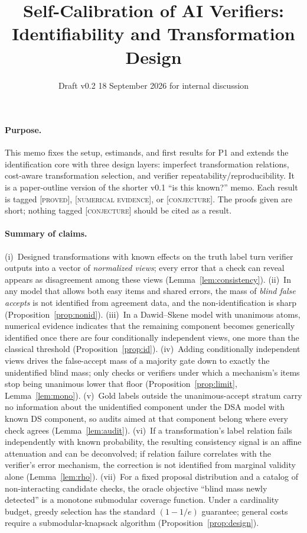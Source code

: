 \documentclass[11pt]{article}
\title{\textbf{Self-Calibration of AI Verifiers:}\\[2pt]
\large Identifiability and Transformation Design}
\author{Draft v0.2 \textperiodcentered{} 18 September 2026 \textperiodcentered{} for internal discussion}
\date{}
\theoremstyle{definition}
\theoremstyle{remark}
\begin{document}
\maketitle
\vspace{-2.5em}

\paragraph{Purpose.} This memo fixes the setup, estimands, and first results for P1 and extends the identification core with three design layers: imperfect transformation relations, cost-aware transformation selection, and verifier repeatability/reproducibility. It is a paper-outline version of the shorter v0.1 ``is this known?'' memo. Each result is tagged \textsc{[proved]}, \textsc{[numerical evidence]}, or \textsc{[conjecture]}. The proofs given are short; nothing tagged \textsc{[conjecture]} should be cited as a result.

\paragraph{Summary of claims.}
(i)~Designed transformations with known effects on the truth label turn verifier outputs into a vector of \emph{normalized views}; every error that a check can reveal appears as disagreement among these views (Lemma~\ref{lem:consistency}).
(ii)~In any model that allows both easy items and shared errors, the mass of \emph{blind false accepts} is not identified from agreement data, and the non-identification is sharp (Proposition~\ref{prop:nonid}).
(iii)~In a Dawid--Skene model with unanimous atoms, numerical evidence indicates that the remaining component becomes generically identified once there are four conditionally independent views, one more than the classical threshold (Proposition~\ref{prop:id}).
(iv)~Adding conditionally independent views drives the false-accept mass of a majority gate down to exactly the unidentified blind mass; only checks or verifiers under which a mechanism's items stop being unanimous lower that floor (Proposition~\ref{prop:limit}, Lemma~\ref{lem:mono}).
(v)~Gold labels outside the unanimous-accept stratum carry no information about the unidentified component under the DSA model with known DS component, so audits aimed at that component belong where every check agrees (Lemma~\ref{lem:audit}).
(vi)~If a transformation's label relation fails independently with known probability, the resulting consistency signal is an affine attenuation and can be deconvolved; if relation failure correlates with the verifier's error mechanism, the correction is not identified from marginal validity alone (Lemma~\ref{lem:rho}).
(vii)~For a fixed proposal distribution and a catalog of non-interacting candidate checks, the oracle objective ``blind mass newly detected'' is a monotone submodular coverage function. Under a cardinality budget, greedy selection has the standard $(1-1/e)$ guarantee; general costs require a submodular-knapsack algorithm (Proposition~\ref{prop:design}).
\end{document}
